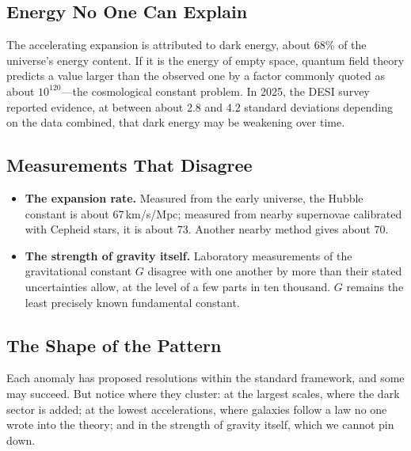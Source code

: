 \documentclass[11pt,a4paper]{article}
\begin{document}
\subsection{Energy No One Can Explain}

The accelerating expansion is attributed to dark energy, about 68\% of the universe's energy content. If it is the energy of empty space, quantum field theory predicts a value larger than the observed one by a factor commonly quoted as about $10^{120}$---the cosmological constant problem. In 2025, the DESI survey reported evidence, at between about 2.8 and 4.2 standard deviations depending on the data combined, that dark energy may be weakening over time. 

\subsection{Measurements That Disagree}

\begin{itemize}
  \item \textbf{The expansion rate.} Measured from the early universe, the Hubble constant is about 67\,km/s/Mpc; measured from nearby supernovae calibrated with Cepheid stars, it is about 73. Another nearby method gives about 70. 
  \item \textbf{The strength of gravity itself.} Laboratory measurements of the gravitational constant $G$ disagree with one another by more than their stated uncertainties allow, at the level of a few parts in ten thousand. $G$ remains the least precisely known fundamental constant.
\end{itemize}

\subsection{The Shape of the Pattern}

Each anomaly has proposed resolutions within the standard framework, and some may succeed. But notice where they cluster: at the largest scales, where the dark sector is added; at the lowest accelerations, where galaxies follow a law no one wrote into the theory; and in the strength of gravity itself, which we cannot pin down. 
\end{document}
